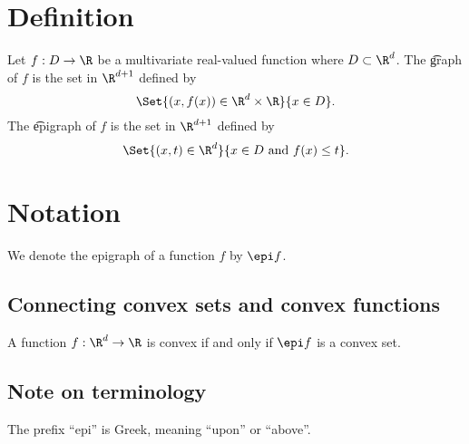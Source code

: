 

\section*{Definition}

Let $f: D \to \R $ be a multivariate real-valued function where $D \subset \R ^d$.
The \t{graph} of $f$ is the set in $\R ^{d + 1}$ defined by
\[
\Set{(x, f(x)) \in \R ^d \times  \R }{x \in D}.
\]
The \t{epigraph} of $f$ is the set in $\R ^{d + 1}$ defined by
\[
\Set{(x, t) \in \R ^{d}}{x \in D \text{ and } f(x) \leq t}.
\]

\section*{Notation}

We denote the epigraph of a function $f$ by $\epi f$.



\subsection*{Connecting convex sets and convex functions}

A function $f: \R ^d \to \R $ is convex if and only if $\epi f$ is a convex set.
\subsection*{Note on terminology}

The prefix ``epi'' is Greek, meaning ``upon'' or ``above''.

\blankpage